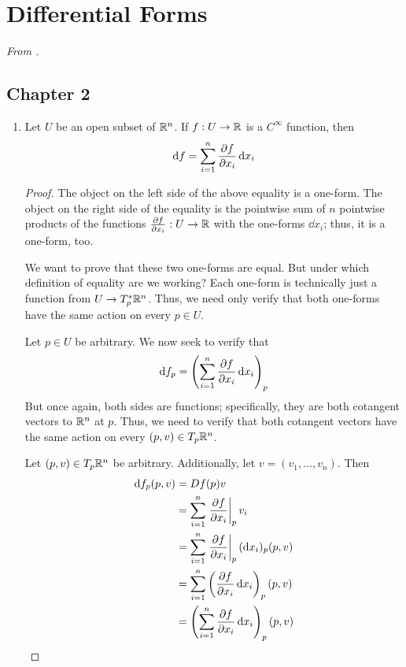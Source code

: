 \documentclass[../psets.tex]{subfiles}
\begin{document}
\section{Differential Forms}
\emph{From \textcite{bib:DifferentialForms}.}
\subsection*{Chapter 2}
\begin{enumerate}[label={\textbf{2.1.\roman*.}}]
    \item {}Let $U$ be an open subset of $\mathbb{R}^n$. If $f:U\to\mathbb{R}$ is a $C^\infty$ function, then
    \begin{equation*}
        \dd{f} = \sum_{i=1}^n\pdv{f}{x_i}\dd{x_i}
    \end{equation*}
    \begin{proof}
        The object on the left side of the above equality is a one-form. The object on the right side of the equality is the pointwise sum of $n$ pointwise products of the functions $\pdv{f}{x_i}:U\to\mathbb{R}$ with the one-forms $\dd{x_i}$; thus, it is a one-form, too.\par
        We want to prove that these two one-forms are equal. But under which definition of equality are we working? Each one-form is technically just a function from $U\to T_p^*\mathbb{R}^n$. Thus, we need only verify that both one-forms have the same action on every $p\in U$.\par
        Let $p\in U$ be arbitrary. We now seek to verify that
        \begin{equation*}
            \dd f_p = \left( \sum_{i=1}^n\pdv{f}{x_i}\dd{x_i} \right)_p
        \end{equation*}
        But once again, both sides are functions; specifically, they are both cotangent vectors to $\mathbb{R}^n$ at $p$. Thus, we need to verify that both cotangent vectors have the same action on every $(p,v)\in T_p\mathbb{R}^n$.\par
        Let $(p,v)\in T_p\mathbb{R}^n$ be arbitrary. Additionally, let $v=(v_1,\dots,v_n)$. Then
        \begin{align*}
            \dd f_p(p,v) &= Df(p)v\\
            &= \sum_{i=1}^n\eval{\pdv{f}{x_i}}_pv_i\\
            &= \sum_{i=1}^n\eval{\pdv{f}{x_i}}_p(\dd{x_i})_p(p,v)\\
            &= \sum_{i=1}^n\left( \pdv{f}{x_i}\dd{x_i} \right)_p(p,v)\\
            &= \left( \sum_{i=1}^n\pdv{f}{x_i}\dd{x_i} \right)_p(p,v)

\end{align*}
\end{proof}
\end{enumerate}
\end{document}
